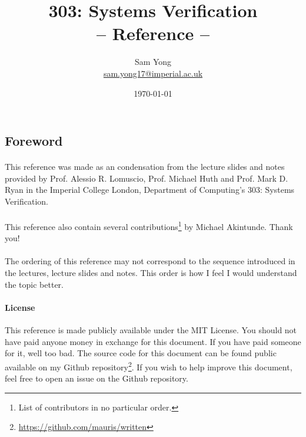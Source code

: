 \documentclass{article}
\title{
	 \huge 303: Systems Verification\\
	 \huge -- Reference --
}
\date{\today}
\author{
	Sam Yong \\
	\small \href{mailto:sam.yong17@imperial.ac.uk}{sam.yong17@imperial.ac.uk}
}
\theoremstyle{plain}
\theoremstyle{definition}
\begin{document}
\maketitle

\begin{multicols}{2}

\section*{Foreword}  

\paragraph{} This reference was made as an condensation from the lecture slides and notes provided by Prof. Alessio R. Lomuscio, Prof. Michael Huth and Prof. Mark D. Ryan in the Imperial College London, Department of Computing's 303: Systems Verification.

\paragraph{} This reference also contain several contributions\footnote{List of contributors in no particular order.} by Michael Akintunde. Thank you!

\paragraph{} The ordering of this reference may not correspond to the sequence introduced in the lectures, lecture slides and notes. This order is how I feel I would understand the topic better.

\begin{footnotesize}
\paragraph{License} This reference is made publicly available under the MIT License. You should not have paid anyone money in exchange for this document. If you have paid someone for it, well too bad. The source code for this document can be found public available on my Github repository\footnote{\href{https://github.com/mauris/written}{https://github.com/mauris/written}}. If you wish to help improve this document, feel free to open an issue on the Github repository.
\end{footnotesize}

\tableofcontents
\newpage


\end{multicols}
\end{document}
